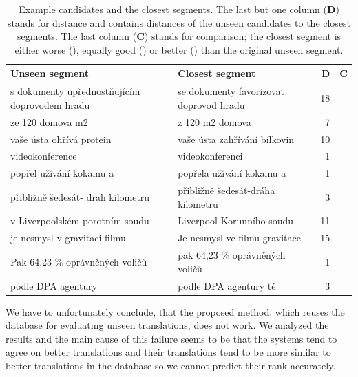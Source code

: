 \begin{table}
  \begin{center}
    \begin{tabular}{|p{5.5cm}p{5.5cm}rc|}
      \hline
      \textbf{Unseen segment} & \textbf{Closest segment} & \textbf{D} & \textbf{C} \\
      \hline
      s dokumenty upřednostňujícím doprovodem hradu & se dokumenty favorizovat doprovod hradu & 18 & \worse{} \\ \hline
      ze 120 domova m2 & z 120 m2 domova & 7 & \better{} \\ \hline
      vaše ústa ohřívá protein & vaše ústa zahřívání bílkovin & 10 & \better{} \\ \hline
      videokonference & videokonferenci & 1 & \better{} \\ \hline
      popřel užívání kokainu a & popřela užívání kokainu a & 1 & \worse{} \\ \hline
      přibližně šedesát- drah kilometru & přibližně šedesát-dráha kilometru & 3 & \equal{} \\ \hline
      v Liverpoolském porotním soudu & Liverpool Korunního soudu & 11 & \better{} \\ \hline
      je nesmysl v gravitaci filmu & Je nesmysl ve filmu gravitace & 15 & \better{} \\ \hline
      Pak 64,23 \% oprávněných voličů & pak 64,23 \% oprávněných voličů & 1 & \better{} \\ \hline
      podle DPA agentury & podle DPA agentury té & 3 & \worse{} \\ \hline
    \end{tabular}
  \end{center}

  \caption[Example candidates and the closest segments]{ Example candidates and
    the closest segments. The last but one column (\textbf{D}) stands for
    distance and contains distances of the unseen candidates to the closest
    segments. The last column (\textbf{C}) stands for comparison; the closest
  segment is either worse (\worse{}), equally good (\equal{}) or better
(\better{}) than the original unseen segment.}

  \label{segments-closest}
\end{table}

We have to unfortunately conclude, that the proposed method, which reuses the
database for evaluating unseen translations, does not work. We analyzed the
results and the main cause of this failure seems to be that the systems tend to
agree on better translations and their translations tend to be more similar to
better translations in the database so we cannot predict their rank accurately. 

